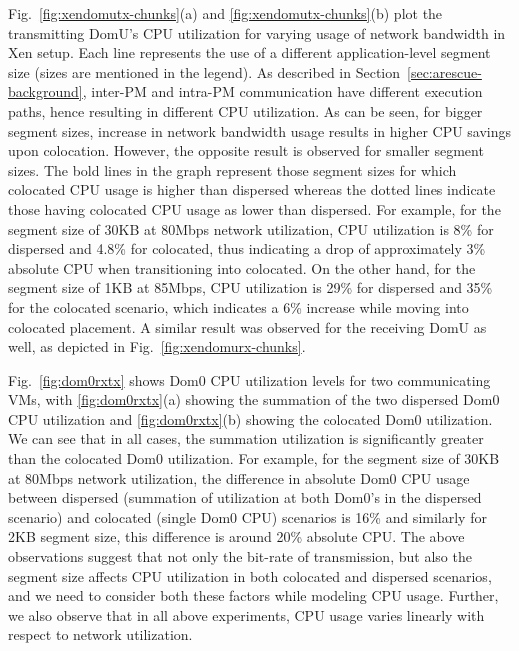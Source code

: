 Fig.~\ref{fig:xendomutx-chunks}(a) and \ref{fig:xendomutx-chunks}(b)
plot the transmitting DomU's CPU utilization for varying usage
of network bandwidth in Xen setup. Each line represents
the use of a different application-level segment size
(sizes are mentioned in the legend).
As described in Section~\ref{sec:arescue-background}, inter-PM and
intra-PM communication have different execution paths,
hence resulting in different CPU utilization.
As can be seen, for bigger segment sizes, increase
in network bandwidth usage results in higher CPU savings upon
colocation. However, the opposite result is
observed for smaller segment sizes.
The bold lines in the graph represent those
segment sizes for which colocated CPU usage is higher than
dispersed whereas the dotted lines indicate those having
colocated CPU usage as lower than dispersed. For example,
for the segment size of 30KB at 80Mbps network utilization,
CPU utilization is 8\% for dispersed and 4.8\% for colocated,
thus indicating a drop of approximately 3\% absolute CPU
when transitioning into colocated. On the other hand,
for the segment size of 1KB at 85Mbps, CPU utilization
is 29\% for dispersed and 35\% for the colocated scenario,
which indicates a 6\% increase while moving into colocated placement.
A similar result was observed for the receiving DomU as well,
as depicted in Fig.~\ref{fig:xendomurx-chunks}.

Fig.~\ref{fig:dom0rxtx} shows Dom0 CPU utilization
levels for two communicating VMs,
with
\ref{fig:dom0rxtx}(a)
showing the summation of the two dispersed Dom0 CPU utilization
and
\ref{fig:dom0rxtx}(b)
showing the colocated Dom0 utilization.
We can see that in all cases,
the summation utilization is significantly greater than the
colocated Dom0 utilization. For example,
for the segment size of 30KB at 80Mbps network utilization,
the difference in absolute Dom0 CPU usage between
dispersed (summation of utilization at both Dom0's in the
dispersed scenario) and colocated (single
Dom0 CPU) scenarios is 16\% and similarly for 2KB segment size,
this difference is around 20\% absolute CPU.
The above observations suggest that not only the bit-rate of
transmission, but also the segment size affects CPU utilization
in both colocated and dispersed scenarios, and we need to consider
both these factors while modeling CPU usage. Further, we also
observe that in all above experiments, CPU usage varies linearly
with respect to network utilization.



